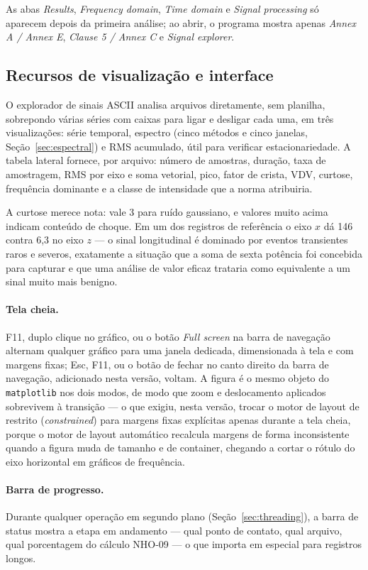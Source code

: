 \documentclass[11pt,a4paper]{article}
\newcommand{\code}[1]{\texttt{\small #1}}
\begin{document}
As abas \emph{Results}, \emph{Frequency domain}, \emph{Time domain} e
\emph{Signal processing} só aparecem depois da primeira análise; ao abrir, o
programa mostra apenas \emph{Annex A / Annex E}, \emph{Clause 5 / Annex C} e
\emph{Signal explorer}.

\subsection{Recursos de visualização e interface}

O explorador de sinais ASCII analisa arquivos diretamente, sem planilha,
sobrepondo várias séries com caixas para ligar e desligar cada uma, em três
visualizações: série temporal, espectro (cinco métodos e cinco janelas,
Seção~\ref{sec:espectral}) e RMS acumulado, útil para verificar
estacionariedade. A tabela lateral fornece, por arquivo: número de amostras,
duração, taxa de amostragem, RMS por eixo e soma vetorial, pico, fator de
crista, VDV, curtose, frequência dominante e a classe de intensidade que a
norma atribuiria.

A curtose merece nota: vale 3 para ruído gaussiano, e valores muito acima
indicam conteúdo de choque. Em um dos registros de referência o eixo $x$ dá 146
contra 6,3 no eixo $z$ --- o sinal longitudinal é dominado por eventos
transientes raros e severos, exatamente a situação que a soma de sexta potência
foi concebida para capturar e que uma análise de valor eficaz trataria como
equivalente a um sinal muito mais benigno.

\paragraph{Tela cheia.} F11, duplo clique no gráfico, ou o botão \emph{Full
screen} na barra de navegação alternam qualquer gráfico para uma janela
dedicada, dimensionada à tela e com margens fixas; Esc, F11, ou o botão de
fechar no canto direito da barra de navegação, adicionado nesta versão, voltam.
A figura é
o mesmo objeto do \code{matplotlib} nos dois modos, de modo que zoom e
deslocamento aplicados sobrevivem à transição --- o que exigiu, nesta versão,
trocar o motor de layout de restrito (\emph{constrained}) para margens fixas
explícitas apenas durante a tela cheia, porque o motor de layout automático
recalcula margens de forma inconsistente quando a figura muda de tamanho e de
container, chegando a cortar o rótulo do eixo horizontal em gráficos de
frequência.

\paragraph{Barra de progresso.} Durante qualquer operação em segundo plano
(Seção~\ref{sec:threading}), a barra de status mostra a etapa em andamento ---
qual ponto de contato, qual arquivo, qual porcentagem do cálculo NHO-09 ---
o que importa em especial para registros longos.
\end{document}
